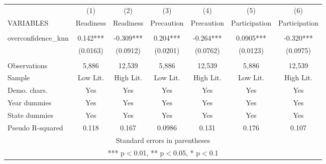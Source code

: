 \documentclass[]{article}
\begin{document}
\begin{tabular}{lcccccc} \hline
 & (1) & (2) & (3) & (4) & (5) & (6) \\
VARIABLES & Readiness & Readiness & Precaution & Precaution & Participation & Participation \\ \hline
 &  &  &  &  &  &  \\
overconfidence\_knn & 0.142*** & -0.309*** & 0.204*** & -0.264*** & 0.0905*** & -0.320*** \\
 & (0.0163) & (0.0912) & (0.0201) & (0.0762) & (0.0123) & (0.0975) \\
 &  &  &  &  &  &  \\
Observations & 5,886 & 12,539 & 5,886 & 12,539 & 5,886 & 12,539 \\
Sample & Low Lit. & High Lit. & Low Lit. & High Lit. & Low Lit. & High Lit. \\
Demo. chars. & Yes & Yes & Yes & Yes & Yes & Yes \\
Year dummies & Yes & Yes & Yes & Yes & Yes & Yes \\
State dummies & Yes & Yes & Yes & Yes & Yes & Yes \\
 Pseudo R-squared & 0.118 & 0.167 & 0.0986 & 0.131 & 0.176 & 0.107 \\ \hline
\multicolumn{7}{c}{ Standard errors in parentheses} \\
\multicolumn{7}{c}{ *** p$<$0.01, ** p$<$0.05, * p$<$0.1} \\
\end{tabular}
\end{document}

